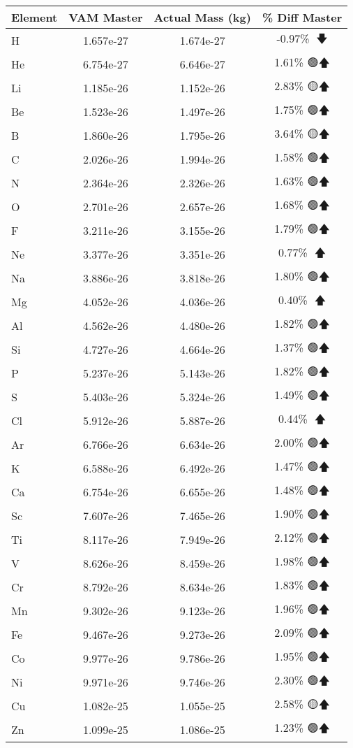 \begin{longtable}{|l|c|c|c|}
\toprule
Element & VAM Master & Actual Mass (kg) & \% Diff Master \\
\midrule
H & 1.657e-27 & 1.674e-27 & -0.97\% 🩷🡇 \\
He & 6.754e-27 & 6.646e-27 & 1.61\% 🟢🡅 \\
Li & 1.185e-26 & 1.152e-26 & 2.83\% 🟡🡅 \\
Be & 1.523e-26 & 1.497e-26 & 1.75\% 🟢🡅 \\
B & 1.860e-26 & 1.795e-26 & 3.64\% 🟡🡅 \\
C & 2.026e-26 & 1.994e-26 & 1.58\% 🟢🡅 \\
N & 2.364e-26 & 2.326e-26 & 1.63\% 🟢🡅 \\
O & 2.701e-26 & 2.657e-26 & 1.68\% 🟢🡅 \\
F & 3.211e-26 & 3.155e-26 & 1.79\% 🟢🡅 \\
Ne & 3.377e-26 & 3.351e-26 & 0.77\% 🩷🡅 \\
Na & 3.886e-26 & 3.818e-26 & 1.80\% 🟢🡅 \\
Mg & 4.052e-26 & 4.036e-26 & 0.40\% 🩷🡅 \\
Al & 4.562e-26 & 4.480e-26 & 1.82\% 🟢🡅 \\
Si & 4.727e-26 & 4.664e-26 & 1.37\% 🟢🡅 \\
P & 5.237e-26 & 5.143e-26 & 1.82\% 🟢🡅 \\
S & 5.403e-26 & 5.324e-26 & 1.49\% 🟢🡅 \\
Cl & 5.912e-26 & 5.887e-26 & 0.44\% 🩷🡅 \\
Ar & 6.766e-26 & 6.634e-26 & 2.00\% 🟢🡅 \\
K & 6.588e-26 & 6.492e-26 & 1.47\% 🟢🡅 \\
Ca & 6.754e-26 & 6.655e-26 & 1.48\% 🟢🡅 \\
Sc & 7.607e-26 & 7.465e-26 & 1.90\% 🟢🡅 \\
Ti & 8.117e-26 & 7.949e-26 & 2.12\% 🟢🡅 \\
V & 8.626e-26 & 8.459e-26 & 1.98\% 🟢🡅 \\
Cr & 8.792e-26 & 8.634e-26 & 1.83\% 🟢🡅 \\
Mn & 9.302e-26 & 9.123e-26 & 1.96\% 🟢🡅 \\
Fe & 9.467e-26 & 9.273e-26 & 2.09\% 🟢🡅 \\
Co & 9.977e-26 & 9.786e-26 & 1.95\% 🟢🡅 \\
Ni & 9.971e-26 & 9.746e-26 & 2.30\% 🟢🡅 \\
Cu & 1.082e-25 & 1.055e-25 & 2.58\% 🟡🡅 \\
Zn & 1.099e-25 & 1.086e-25 & 1.23\% 🟢🡅 \\

\end{longtable}
